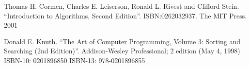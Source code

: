 \documentclass[b5paper]{article}
\begin{document}
\ifx\wholebook\relax \else
\begin{thebibliography}{99}

Thomas H. Cormen, Charles E. Leiserson, Ronald L. Rivest and Clifford Stein.
``Introduction to Algorithms, Second Edition''. ISBN:0262032937. The MIT Press. 2001

Donald E. Knuth. ``The Art of Computer Programming, Volume 3: Sorting and Searching (2nd Edition)''. Addison-Wesley Professional; 2 edition (May 4, 1998) ISBN-10: 0201896850 ISBN-13: 978-0201896855

\end{thebibliography}
\end{document}
